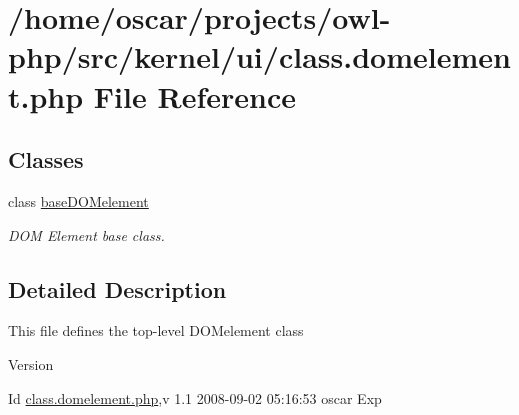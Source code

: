 \section{/home/oscar/projects/owl-\/php/src/kernel/ui/class.domelement.php File Reference}
\label{class_8domelement_8php}
\subsection*{Classes}
\begin{DoxyCompactItemize}
\item 
class \hyperlink{classbaseDOMelement}{baseDOMelement}
\begin{DoxyCompactList}\small\item\em DOM Element base class. \item\end{DoxyCompactList}\end{DoxyCompactItemize}


\subsection{Detailed Description}
This file defines the top-\/level DOMelement class \begin{DoxyVersion}{Version}

\end{DoxyVersion}
\begin{DoxyParagraph}{Id}
\hyperlink{class_8domelement_8php}{class.domelement.php},v 1.1 2008-\/09-\/02 05:16:53 oscar Exp 
\end{DoxyParagraph}
